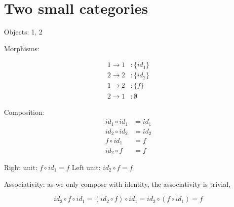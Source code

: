 \section{Two small categories}

Objects: 1, 2

Morphisms: 

\begin{align*} 
1 \rightarrow 1 &: \{id_1\}  \\
2 \rightarrow 2 &: \{id_2\}  \\
1 \rightarrow 2 &: \{f\}     \\
2 \rightarrow 1 &: \emptyset
\end{align*} 

Composition:
\begin{align*} 
  id_1 \circ id_1 &= id_1 \\
  id_2 \circ id_2 &= id_2 \\
     f \circ id_1 &= f \\
     id_2 \circ f &= f 
\end{align*} 

Right unit: $f \circ id_1 = f$
Left unit: $id_2 \circ f = f$

Associativity: as we only compose with identity, the associativity is trivial,

$$
   id_2 \circ f \circ  id_1 = (id_2 \circ f) \circ  id_1 = id_2 \circ  (f \circ id_1) = f
$$
